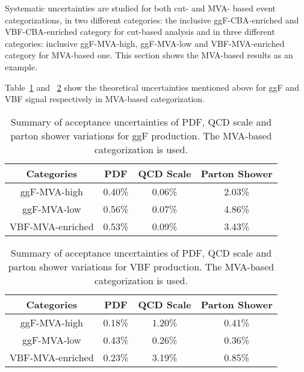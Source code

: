 Systematic uncertainties are studied for both cut- and MVA- based event categorizations, 
in two different categories: the inclusive ggF-CBA-enriched and VBF-CBA-enriched category for cut-based analysis and in three different categories: inclusive ggF-MVA-high, ggF-MVA-low and VBF-MVA-enriched category for MVA-based one.
This section shows the MVA-based results as an example.

Table~\ref{tab:acc-ggF-dnn} and ~\ref{tab:acc-VBF-dnn} show the theoretical uncertainties mentioned above for ggF and VBF signal respectively in MVA-based categorization.

\begin{table}[htbp]
  \centering
  \caption{Summary of acceptance uncertainties of PDF, QCD scale and parton shower variations for ggF production. The MVA-based categorization is used.}
  \label{tab:acc-ggF-dnn}
  \begin{spacing}{0.75}
  \begin{tabular}{cccc}
    \toprule
    Categories  & PDF    & QCD Scale  & Parton Shower \\
    \midrule
    ggF-MVA-high  & 0.40\% & 0.06\% & 2.03\% \\
    ggF-MVA-low   & 0.56\% & 0.07\% & 4.86\% \\
    VBF-MVA-enriched  & 0.53\% & 0.09\% & 3.43\% \\
    \bottomrule
  \end{tabular}
  \end{spacing}
\end{table}

\begin{table}[htbp]
  \centering
  \caption{Summary of acceptance uncertainties of PDF, QCD scale and parton shower variations for VBF production. The MVA-based categorization is used.}
  \label{tab:acc-VBF-dnn}
  \begin{spacing}{0.75}
  \begin{tabular}{cccc}
    \toprule
    Categories  & PDF    & QCD Scale  & Parton Shower \\
    \midrule
    ggF-MVA-high  & 0.18\% & 1.20\% & 0.41\% \\
    ggF-MVA-low   & 0.43\% & 0.26\% & 0.36\% \\
    VBF-MVA-enriched  & 0.23\% & 3.19\% & 0.85\% \\
    \bottomrule
  \end{tabular}
  \end{spacing}
\end{table}

